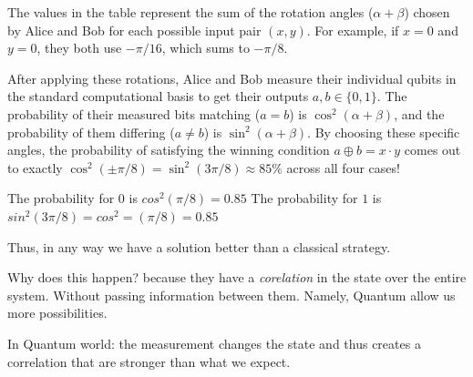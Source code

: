 \begin{insight}
    The values in the table represent the sum of the rotation angles ($\alpha + \beta$) chosen by Alice and Bob for each possible input pair $(x,y)$. For example, if $x=0$ and $y=0$, they both use $-\pi/16$, which sums to $-\pi/8$. 
    
    After applying these rotations, Alice and Bob measure their individual qubits in the standard computational basis to get their outputs $a, b \in \{0, 1\}$. 
    The probability of their measured bits matching ($a=b$) is $\cos^2(\alpha+\beta)$, and the probability of them differing ($a \neq b$) is $\sin^2(\alpha+\beta)$. By choosing these specific angles, the probability of satisfying the winning condition $a \oplus b = x \cdot y$ comes out to exactly $\cos^2(\pm\pi/8) = \sin^2(3\pi/8) \approx 85\%$ across all four cases!
\end{insight}
The probability for $0$ is $cos^2(\pi/8)=0.85$
The probability for $1$ is $sin^2(3\pi/8)=cos^2=(\pi/8)=0.85$

Thus, in any way we have a solution better than a classical strategy.

Why does this happen? because they have a \emph{corelation} in the state over the entire system. Without passing information between them.
Namely, Quantum allow us more possibilities.

In Quantum world: the measurement changes the state and thus creates a correlation that are stronger than what we expect.
